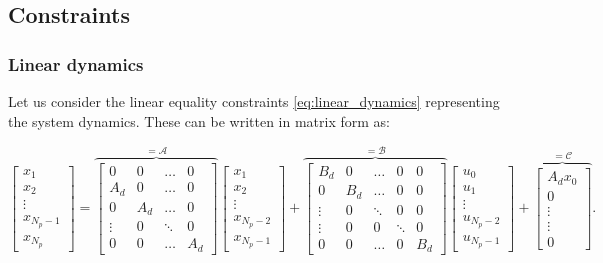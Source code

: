 \documentclass[a4paper,12pt,fleqn]{article}
\newcommand{\Np}{{N_p}}
\begin{document}
\subsection{Constraints}
\subsubsection{Linear dynamics}
Let us consider the linear equality constraints \eqref{eq:linear_dynamics} representing the system dynamics. These can 
be written in matrix form as:
\begin{small}
\begin{equation}
\begin{bmatrix}
x_1\\
x_2\\
\vdots\\
x_{\Np-1}\\
x_{\Np}
\end{bmatrix}=
\overbrace{
\begin{bmatrix}
 0      &0      &\dots  &0\\
 A_d    &0      &\dots  & 0\\
 0      &A_d    &\dots  &0\\
 \vdots &0      &\ddots & 0\\
 0      &0      &\dots  &A_d
\end{bmatrix}
}^{=\mathcal{A}}
\begin{bmatrix}
x_1\\
x_2\\
\vdots\\
x_{\Np-2}\\
x_{\Np-1} 
\end{bmatrix} +
\overbrace{
\begin{bmatrix}
 B_d    &0      &\dots  &0        & 0\\
 0      &B_d    &\dots  &0        & 0\\
 \vdots &0      &\ddots &0        & 0\\
 \vdots &0      &0      &\ddots   & 0\\
 0      &0      &\dots  &0        &B_d
\end{bmatrix}
}^{=\mathcal{B}}
\begin{bmatrix}
u_0\\
u_1\\
\vdots\\
u_{\Np-2}\\
u_{\Np-1} 
\end{bmatrix} +
\overbrace{
\begin{bmatrix}
A_d x_0\\
0\\
\vdots\\
\vdots \\
0 
\end{bmatrix}
}^{=\mathcal{C}}.
\end{equation}
\end{small}
\end{document}
